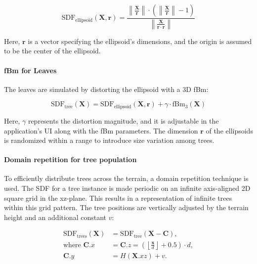 \begin{equation}
\text{SDF}_\text{ellipsoid}(\mathbf{X}, \mathbf{r}) = \frac{\left\|\frac{\mathbf{X}}{\mathbf{r}}\right\| \cdot \left(\left\|\frac{\mathbf{X}}{\mathbf{r}}\right\| - 1\right)}{\left\|\frac{\mathbf{X}}{\mathbf{r} \cdot \mathbf{r}}\right\|}
\end{equation}

Here, $\mathbf{r}$ is a vector specifying the ellipsoid's dimensions, and the origin is assumed to be the center of the ellipsoid.

\paragraph{fBm for Leaves}
The leaves are simulated by distorting the ellipsoid with a 3D fBm:

\begin{equation}
\text{SDF}_\text{tree}(\mathbf{X}) = \text{SDF}_\text{ellipsoid}(\mathbf{X}, \mathbf{r}) + \gamma \cdot \text{fBm}_3(\mathbf{X})
\end{equation}

Here, $\gamma$ represents the distortion magnitude, and it is adjustable in the application's UI along with the fBm parameters. The dimension $\mathbf{r}$ of the ellipsoids is randomized within a range to introduce size variation among trees.

\paragraph{Domain repetition for tree population}
To efficiently distribute trees across the terrain, a domain repetition technique is used. The SDF for a tree instance is made periodic on an infinite axis-aligned 2D square grid in the xz-plane. This results in a representation of infinite trees within this grid pattern. The tree positions are vertically adjusted by the terrain height and an additional constant $v$:

\begin{equation}
\begin{aligned}
\text{SDF}_\text{trees}(\mathbf{X}) &= \text{SDF}_\text{tree}(\mathbf{X} - \mathbf{C}), \\
\text{where } \mathbf{C}.x &= \mathbf{C}.z = \left(\left\lfloor \frac{\mathbf{x}}{d} \right\rfloor + 0.5\right) \cdot d, \\
\mathbf{C}.y &= H(\mathbf{X}.{xz}) + v.
\end{aligned}
\end{equation}

